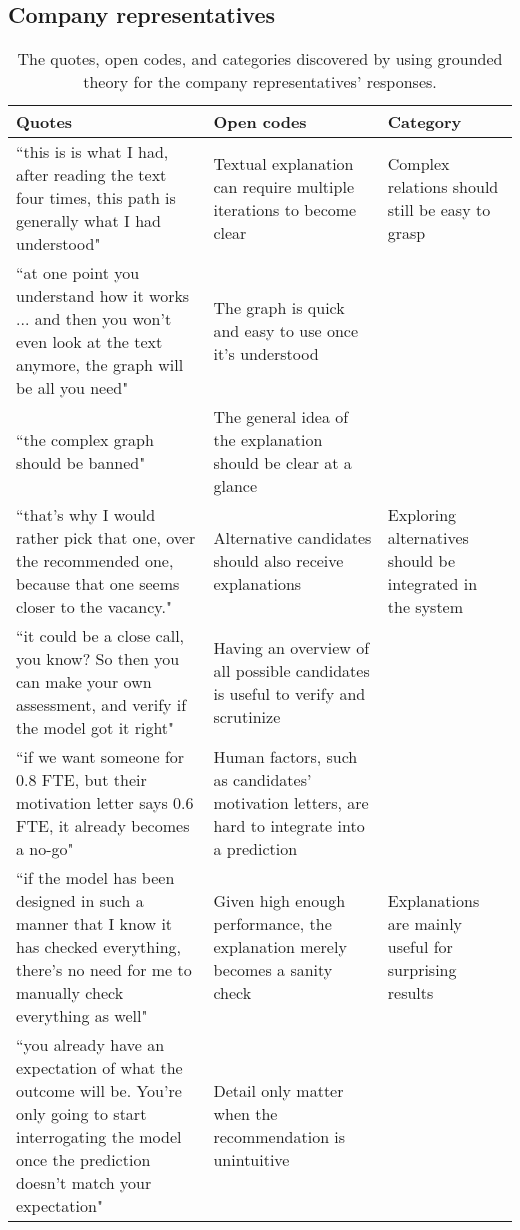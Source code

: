 \subsection{Company representatives}
\begin{table*}[]
\captionsetup{width=1.5\textwidth}
\footnotesize
\begin{adjustwidth}{-2.5in}{-2.5in}
\centering
\begin{tabularx}{1.5\textwidth}{@{}X>{\raggedright\arraybackslash}p{6.5cm}>{\raggedright\arraybackslash}p{3.5cm}@{}}

\toprule
\textbf{Quotes} &
  \textbf{Open codes} &
  \textbf{Category} \\ \midrule
``this is is what I had, after reading the text four times, this path is generally what I had understood" &
  Textual explanation can require multiple iterations to become clear &
  Complex relations should still be easy to grasp \\ \cmidrule(r){1-1}
``at one point you understand how it works ... and then you won't even look at the text anymore, the graph will be all you need" &
  The graph is quick and easy to use once it's understood &
   \\ \cmidrule(r){1-1}
``the complex graph should be banned" &
  The general idea of the explanation should be clear at a glance &
   \\ \midrule
``that's why I would rather pick that one, over the recommended one, because that one seems closer to the vacancy." &
  Alternative candidates should also receive explanations &
  Exploring alternatives should be integrated in the system \\ \cmidrule(r){1-1}
``it could be a close call, you know? So then you can make your own assessment, and verify if the model got it right" &
  Having an overview of all possible candidates is useful to verify and scrutinize &
   \\ \cmidrule(r){1-1}
``if we want someone for 0.8 FTE, but their motivation letter says 0.6 FTE, it already becomes a no-go" &
  Human factors, such as candidates' motivation letters, are hard to integrate into a prediction &
   \\ \midrule
``if the model has been designed in such a manner that I know it has checked everything, there's no need for me to manually check everything as well" &
  Given high enough performance, the explanation merely becomes a sanity check &
  Explanations are mainly useful for surprising results \\ \cmidrule(r){1-1}
``you already have an expectation of what the outcome will be. You're only going to start interrogating the model once the prediction doesn't match your expectation" &
  Detail only matter when the recommendation is unintuitive &
   \\ \bottomrule
   
\end{tabularx}
\end{adjustwidth}
\caption{The quotes, open codes, and categories discovered by using grounded theory for the company representatives' responses.}
\label{tab:companies_GT}   
\end{table*}

